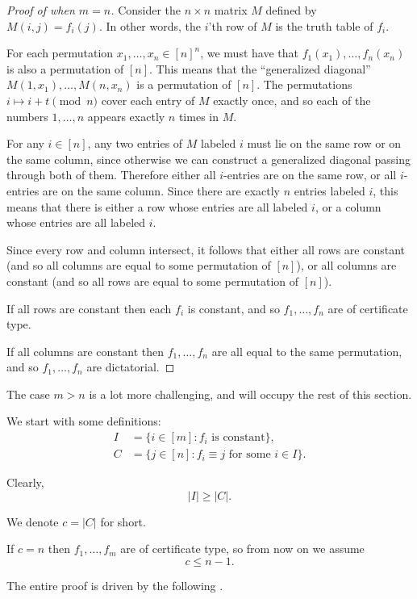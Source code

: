 \documentclass{article}
\theoremstyle{definition}
\theoremstyle{remark}
\begin{document}
\begin{proof}[Proof of  when $m = n$]
Consider the $n \times n$ matrix $M$ defined by $M(i,j) = f_i(j)$. In other words, the $i$'th row of $M$ is the truth table of $f_i$.

For each permutation $x_1,\dots,x_n \in [n]^n$, we must have that $f_1(x_1),\dots,f_n(x_n)$ is also a permutation of $[n]$. This means that the ``generalized diagonal'' $M(1,x_1),\dots,M(n,x_n)$ is a permutation of $[n]$.
The permutations $i \mapsto i + t \pmod{n}$ cover each entry of $M$ exactly once, and so each of the numbers $1,\dots,n$ appears exactly $n$ times in $M$.

For any $i \in [n]$, any two entries of $M$ labeled $i$ must lie on the same row or on the same column, since otherwise we can construct a generalized diagonal passing through both of them.
Therefore either all $i$-entries are on the same row, or all $i$-entries are on the same column. Since there are exactly $n$ entries labeled $i$, this means that there is either a row whose entries are all labeled $i$, or a column whose entries are all labeled $i$.

Since every row and column intersect, it follows that either all rows are constant (and so all columns are equal to some permutation of $[n]$), or all columns are constant (and so all rows are equal to some permutation of $[n]$).

If all rows are constant then each $f_i$ is constant, and so $f_1,\dots,f_n$ are of certificate type.

If all columns are constant then $f_1,\dots,f_n$ are all equal to the same permutation, and so $f_1,\dots,f_n$ are dictatorial.
\end{proof}

The case $m > n$ is a lot more challenging, and will occupy the rest of this section.

We start with some definitions:
\begin{align*}
I &= \{ i \in [m] : f_i \text{ is constant} \}, \\
C &= \{ j \in [n] : f_i \equiv j \text{ for some } i \in I \}.
\end{align*}

Clearly,
\[
 |I| \ge |C|.
\]

We denote $c = |C|$ for short.

If $c = n$ then $f_1,\dots,f_m$ are of certificate type, so from now on we assume
\[
 c \leq n - 1.
\]

The entire proof is driven by the following .
\end{document}
